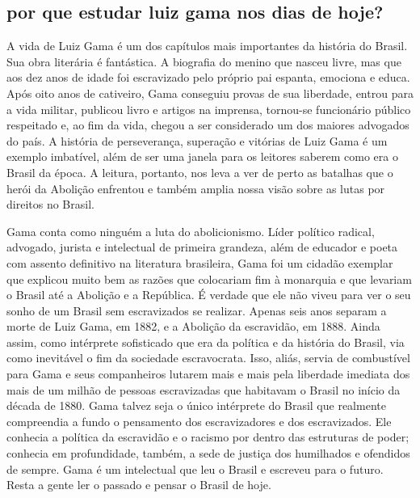 \subsection{por que estudar luiz gama nos dias de hoje?}

A vida de Luiz Gama é um dos capítulos mais importantes da história do
Brasil. Sua obra literária é fantástica. A biografia do menino que
nasceu livre, mas que aos dez anos de idade foi escravizado pelo próprio
pai espanta, emociona e educa. Após oito anos de cativeiro, Gama
conseguiu provas de sua liberdade, entrou para a vida militar, publicou
livro e artigos na imprensa, tornou-se funcionário público respeitado e,
ao fim da vida, chegou a ser considerado um dos maiores advogados do
país. A história de perseverança, superação e vitórias de Luiz Gama é um
exemplo imbatível, além de ser uma janela para os leitores saberem como
era o Brasil da época. A leitura, portanto, nos leva a ver de perto as
batalhas que o herói da Abolição enfrentou e também amplia nossa visão
sobre as lutas por direitos no Brasil.

Gama conta como ninguém a luta do abolicionismo. Líder político radical,
advogado, jurista e intelectual de primeira grandeza, além de educador e
poeta com assento definitivo na literatura brasileira, Gama foi um
cidadão exemplar que explicou muito bem as razões que colocariam fim à
monarquia e que levariam o Brasil até a Abolição e a República. É
verdade que ele não viveu para ver o seu sonho de um Brasil sem
escravizados se realizar. Apenas seis anos separam a morte de Luiz Gama,
em 1882, e a Abolição da escravidão, em 1888. Ainda assim, como
intérprete sofisticado que era da política e da história do Brasil, via
como inevitável o fim da sociedade escravocrata. Isso, aliás, servia de
combustível para Gama e seus companheiros lutarem mais e mais pela
liberdade imediata dos mais de um milhão de pessoas escravizadas que
habitavam o Brasil no início da década de 1880. Gama talvez seja o único
intérprete do Brasil que realmente compreendia a fundo o pensamento dos
escravizadores e dos escravizados. Ele conhecia a política da escravidão
e o racismo por dentro das estruturas de poder; conhecia em
profundidade, também, a sede de justiça dos humilhados e ofendidos de
sempre. Gama é um intelectual que leu o Brasil e escreveu para o futuro.
Resta a gente ler o passado e pensar o Brasil de hoje.


